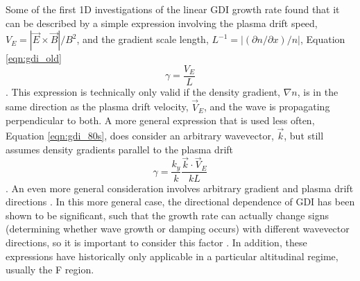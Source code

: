 Some of the first 1D investigations of the linear GDI growth rate found that it can be described by a simple expression involving the plasma drift speed, \(V_E = |\vec{E}\times\vec{B}|/B^2\), and the gradient scale length, \(L^{-1} = |(\partial n/\partial x)/n|\), Equation \ref{eqn:gdi_old} \citep{Simon1963,Hoh1963,Linson1970}
\begin{equation}
	\label{eqn:gdi_old}
	\gamma = \frac{V_E}{L}
\end{equation}.
This expression is technically only valid if the density gradient, \(\nabla n\), is in the same direction as the plasma drift velocity, \(\vec{V}_E\), and the wave is propagating perpendicular to both.  A more general expression that is used less often, Equation \ref{eqn:gdi_80s}, does consider an arbitrary wavevector, \(\vec{k}\), but still assumes density gradients parallel to the plasma drift \citep{Tsunoda1988}
\begin{equation}
	\label{eqn:gdi_80s}
	\gamma = \frac{k_y}{k}\frac{\vec{k}\cdot\vec{V}_E}{kL}
\end{equation}.
An even more general consideration involves arbitrary gradient and plasma drift directions \citep{Kesknien1982,Makarevich2014c}.  In this more general case, the directional dependence of GDI has been shown to be significant, such that the growth rate can actually change signs (determining whether wave growth or damping occurs) with different wavevector directions, so it is important to consider this factor \citep{Makarevich2014c}.  In addition, these expressions have historically only applicable in a particular altitudinal regime, usually the F region.

